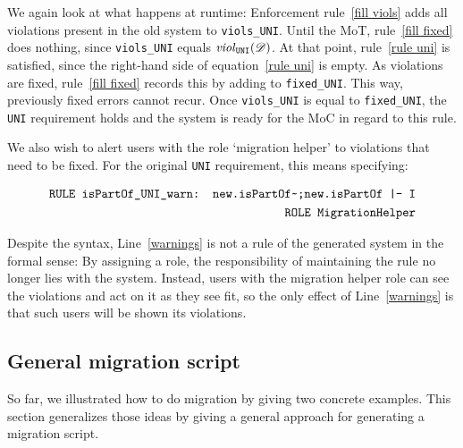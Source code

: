 \documentclass[runningheads]{llncs}
\newcommand{\id}[1]{\text{\it #1\/}}
\newcommand{\viol}[2]{\violC{#1}(#2)}
\newcommand{\violC}[1]{\id{viol}_{#1}}
\newcommand{\dataset}{\mathscr{D}}
\begin{document}
   We again look at what happens at runtime:
   Enforcement rule~\ref{fill viols} adds all violations present in the old system to {\tt viols\_UNI}.
   Until the MoT, rule~\ref{fill fixed} does nothing, since {\tt viols\_UNI} equals $\viol{\tt UNI}{\dataset}$.
   At that point, rule~\ref{rule uni} is satisfied, since the right-hand side of equation~\ref{rule uni} is empty.
   As violations are fixed, rule~\ref{fill fixed} records this by adding to {\tt fixed\_UNI}.
   This way, previously fixed errors cannot recur.
   Once {\tt viols\_UNI} is equal to {\tt fixed\_UNI}, the \verb=UNI= requirement holds and the system is ready for the MoC in regard to this rule.
   
   We also wish to alert users with the role `migration helper' to violations that need to be fixed.
   For the original \verb=UNI= requirement, this means specifying:
   
\begin{align}
   \begin{aligned}
   \text{\tt RULE isPartOf\_UNI\_warn: new.isPartOf\textasciitilde;new.isPartOf |- I}\\
   \quad\text{\tt ROLE MigrationHelper}
   \end{aligned}\label{warnings}
\end{align}
   
   Despite the syntax, Line~{\ref{warnings}} is not a rule of the generated system in the formal sense:
   By assigning a role, the responsibility of maintaining the rule no longer lies with the system.
   Instead, users with the migration helper role can see the violations and act on it as they see fit, so the only effect of Line~{\ref{warnings}} is that such users will be shown its violations.

\subsection{General migration script}\label{General migration script}
   So far, we illustrated how to do migration by giving two concrete examples.
   This section generalizes those ideas by giving a general approach for generating a migration script.
   
\end{document}
